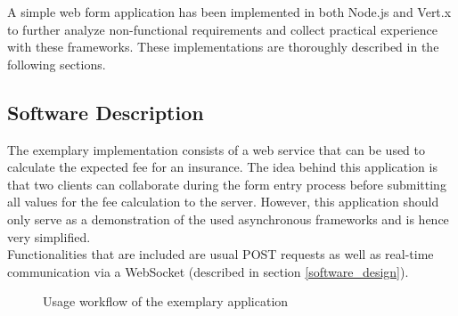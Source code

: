 A simple web form application has been implemented in both Node.js and Vert.x to
further analyze non-functional requirements and collect practical experience
with these frameworks. These implementations are thoroughly described in the following sections.

\subsection{Software Description}
\label{software_description}
\FloatBarrier
The exemplary implementation consists of a web service that can be used to calculate
the expected fee for an insurance. The idea behind this application is that
two clients can collaborate during the form entry process before submitting
all values for the fee calculation to the server.
However, this application should only serve as a demonstration of the used asynchronous 
frameworks and is hence very simplified.\\
Functionalities that are included are usual POST requests as well as real-time communication
via a WebSocket (described in section \ref{software_design}).

\begin{figure}[h]
	\centering
	\setlength\fboxsep{2pt}
	\caption{Usage workflow of the exemplary application}
	\label{fig:application_workflow}
\end{figure}


